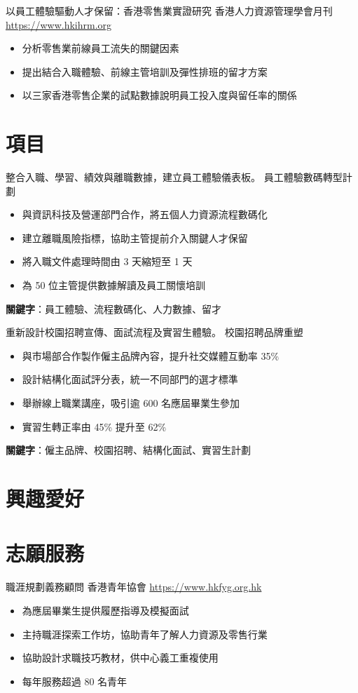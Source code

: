 \documentclass[a4paper, serif, 10pt]{moderncv}
\begin{document}
        {以員工體驗驅動人才保留：香港零售業實證研究}
        {香港人力資源管理學會月刊}
        {\url{https://www.hkihrm.org}}
        {}
        {\begin{itemize}
\item 分析零售業前線員工流失的關鍵因素
\item 提出結合入職體驗、前線主管培訓及彈性排班的留才方案
\item 以三家香港零售企業的試點數據說明員工投入度與留任率的關係
\end{itemize}}
\section{項目}

        {整合入職、學習、績效與離職數據，建立員工體驗儀表板。}
        {員工體驗數碼轉型計劃}
        {}
        {}
        {\begin{itemize}
\item 與資訊科技及營運部門合作，將五個人力資源流程數碼化
\item 建立離職風險指標，協助主管提前介入關鍵人才保留
\item 將入職文件處理時間由 3 天縮短至 1 天
\item 為 50 位主管提供數據解讀及員工關懷培訓
\end{itemize}
\textbf{關鍵字}：員工體驗、流程數碼化、人力數據、留才}

        {重新設計校園招聘宣傳、面試流程及實習生體驗。}
        {校園招聘品牌重塑}
        {}
        {}
        {\begin{itemize}
\item 與市場部合作製作僱主品牌內容，提升社交媒體互動率 35\%
\item 設計結構化面試評分表，統一不同部門的選才標準
\item 舉辦線上職業講座，吸引逾 600 名應屆畢業生參加
\item 實習生轉正率由 45\% 提升至 62\%
\end{itemize}
\textbf{關鍵字}：僱主品牌、校園招聘、結構化面試、實習生計劃}
\section{興趣愛好}

\section{志願服務}

        {職涯規劃義務顧問}
        {香港青年協會}
        {\url{https://www.hkfyg.org.hk}}
        {}
        {\begin{itemize}
\item 為應屆畢業生提供履歷指導及模擬面試
\item 主持職涯探索工作坊，協助青年了解人力資源及零售行業
\item 協助設計求職技巧教材，供中心義工重複使用
\item 每年服務超過 80 名青年
\end{itemize}}
    
\end{document}
